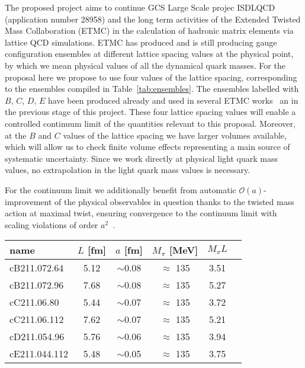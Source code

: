 
The proposed project aims to continue GCS Large Scale projec ISDLQCD
(application number 28958) and the long term activities of the
Extended Twisted Mass Collaboration (ETMC) in the calculation of
hadronic matrix elements via lattice QCD simulations. ETMC has
produced and is still producing gauge configuration ensembles at
different lattice spacing values at the physical point, by which we
mean physical values of all the dynamical quark masses. For the
proposal here we propose to use four values of the lattice spacing,
corresponding to the ensembles compiled in Table~\ref{tab:ensembles}. The
ensembles labelled with $B$, $C$, $D$, $E$ have been produced already
and used in several ETMC
works~\cite{ExtendedTwistedMass:2021qui,ExtendedTwistedMass:2021gbo,ExtendedTwistedMass:2022jpw,ExtendedTwistedMassCollaborationETMC:2022sta}
an in the previous stage of this project.
These four lattice spacing values will enable a controlled continuum
limit of the quantities relevant to this proposal.
Moreover, at the $B$ and $C$ values of the lattice spacing we have
larger volumes available, which will allow us to check finite volume
effects representing a main source of systematic uncertainty.
Since we work directly at physical light quark mass values, no
extrapolation in the light quark mass values is necessary.

For the continuum limit we additionally benefit from automatic
$\mathcal{O}(a)$-improvement of the physical observables in question
thanks to the twisted mass action at
maximal twist, ensuring convergence to the continuum
limit with scaling violations of order $a^2$~\cite{Frezzotti:2003ni}.

\begin{SCtable}[.4]
	\centering %
	\begin{tabular}{lccccr} %
		\toprule
		name          & $L$ [fm]      & $a$
		[fm]          & $M_\pi$ [MeV] & $M_\pi L$                         \\
		\midrule
		\midrule
		cB211.072.64  & 5.12          & $\sim$0.08 & $\approx$ 135 & 3.51 \\
		cB211.072.96  & 7.68          & $\sim$0.08 & $\approx$ 135 & 5.27 \\
		\hline
		cC211.06.80   & 5.44          & $\sim$0.07 & $\approx$ 135 & 3.72 \\
		cC211.06.112  & 7.62          & $\sim$0.07 & $\approx$ 135 & 5.21 \\
		\hline
		cD211.054.96  & 5.76          & $\sim$0.06 & $\approx$ 135 & 3.94 \\
		\hline
		cE211.044.112 & 5.48          & $\sim$0.05 & $\approx$ 135 & 3.75 \\
		\bottomrule
	\end{tabular}
	\caption{ETMC's $N_f=2+1+1$ gauge ensembles relevant for this
		proposal. The time extent is always set to $T=2L$.}
	\label{tab:ensembles}
\end{SCtable}

